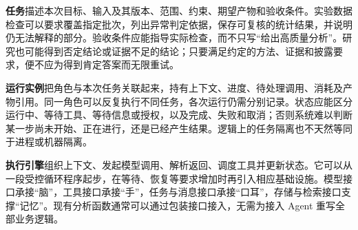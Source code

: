\documentclass[11pt,a4paper]{article}
\begin{document}
\textbf{任务}描述本次目标、输入及其版本、范围、约束、期望产物和验收条件。实验数据检查可以要求覆盖指定批次，列出异常判定依据，保存可复核的统计结果，并说明仍无法解释的部分。验收条件应能指导实际检查，而不只写“给出高质量分析”。研究也可能得到否定结论或证据不足的结论；只要满足约定的方法、证据和披露要求，便不应为得到肯定答案而无限重试。

\textbf{运行实例}把角色与本次任务关联起来，持有上下文、进度、待处理调用、消耗及产物引用。同一角色可以反复执行不同任务，各次运行仍需分别记录。状态应能区分运行中、等待工具、等待信息或授权，以及完成、失败和取消；否则系统难以判断某一步尚未开始、正在进行，还是已经产生结果。逻辑上的任务隔离也不天然等同于进程或机器隔离。

\textbf{执行引擎}组织上下文、发起模型调用、解析返回、调度工具并更新状态。它可以从一段受控循环程序起步，在等待、恢复等要求增加时再引入相应基础设施。模型接口承接“脑”，工具接口承接“手”，任务与消息接口承接“口耳”，存储与检索接口支撑“记忆”。现有分析函数通常可以通过包装接口接入，无需为接入 Agent 重写全部业务逻辑。
\end{document}
